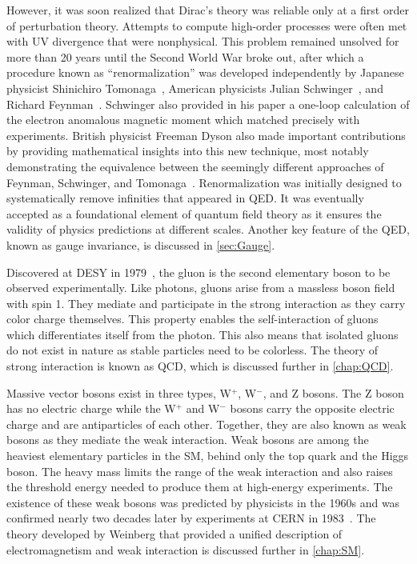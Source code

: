 However, it was soon realized that Dirac's theory was reliable only at a first order of perturbation theory. Attempts to compute high-order processes were often met with \ac{UV} divergence that were nonphysical. This problem remained unsolved for more than 20 years until the Second World War broke out, after which a procedure known as ``renormalization'' was developed independently by Japanese physicist Shinichiro Tomonaga~\cite{Tomonaga:1946zz}, American physicists Julian Schwinger~\cite{Schwinger:1948iu}, and Richard Feynman~\cite{Feynman:1950ir}. Schwinger also provided in his paper a one-loop calculation of the electron anomalous magnetic moment which matched precisely with experiments. British physicist Freeman Dyson also made important contributions by providing mathematical insights into this new technique, most notably demonstrating the equivalence between the seemingly different approaches of Feynman, Schwinger, and Tomonaga~\cite{Dyson:1949bp}. Renormalization was initially designed to systematically remove infinities that appeared in \ac{QED}. It was eventually accepted as a foundational element of quantum field theory as it ensures the validity of physics predictions at different scales. Another key feature of the \ac{QED}, known as gauge invariance, is discussed in \autoref{sec:Gauge}.

Discovered at DESY in 1979~\cite{TASSO:1979zyf}, the gluon is the second elementary boson to be observed experimentally. Like photons, gluons arise from a massless boson field with spin 1. They mediate and participate in the strong interaction as they carry color charge themselves. This property enables the self-interaction of gluons which differentiates itself from the photon. This also means that isolated gluons do not exist in nature as stable particles need to be colorless. The theory of strong interaction is known as \ac{QCD}, which is discussed further in \autoref{chap:QCD}.

Massive vector bosons exist in three types, W$^{+}$, W$^{-}$, and Z bosons. The Z boson has no electric charge while the W$^{+}$ and W$^{-}$ bosons carry the opposite electric charge and are antiparticles of each other. Together, they are also known as weak bosons as they mediate the weak interaction. Weak bosons are among the heaviest elementary particles in the \ac{SM}, behind only the top quark and the Higgs boson. The heavy mass limits the range of the weak interaction and also raises the threshold energy needed to produce them at high-energy experiments. The existence of these weak bosons was predicted by physicists in the 1960s and was confirmed nearly two decades later by experiments at \ac{CERN} in 1983~\cite{UA1:1983crd,UA2:1983tsx,UA1:1983mne,UA2:1983mlz}. The theory developed by Weinberg that provided a unified description of electromagnetism and weak interaction is discussed further in \autoref{chap:SM}.

